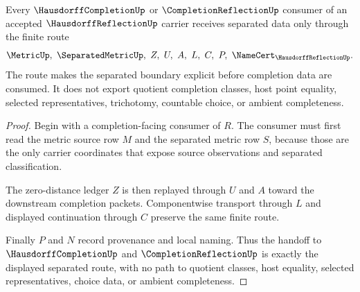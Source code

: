 \begin{theorem}
\label{thm:hausdorff-reflection-separated-handoff}
Every $\HausdorffCompletionUp$ or $\CompletionReflectionUp$ consumer of an accepted $\HausdorffReflectionUp$ carrier receives separated data only through the finite route
$$
\MetricUp,\ \SeparatedMetricUp,\ Z,\ U,\ A,\ L,\ C,\ P,\ \NameCert_{\HausdorffReflectionUp}.
$$
The route makes the separated boundary explicit before completion data are consumed. It does not export quotient completion classes, host point equality, selected representatives, trichotomy, countable choice, or ambient completeness.
\end{theorem}
\begin{proof}
Begin with a completion-facing consumer of $R$. The consumer must first read the metric source row $M$ and the separated metric row $S$, because those are the only carrier coordinates that expose source observations and separated classification.

The zero-distance ledger $Z$ is then replayed through $U$ and $A$ toward the downstream completion packets. Componentwise transport through $L$ and displayed continuation through $C$ preserve the same finite route.

Finally $P$ and $N$ record provenance and local naming. Thus the handoff to $\HausdorffCompletionUp$ and $\CompletionReflectionUp$ is exactly the displayed separated route, with no path to quotient classes, host equality, selected representatives, choice data, or ambient completeness.
\end{proof}


\begin{closurestatus}{\HausdorffReflectionUp}
  \theoryclosure{\seedClosure}
  \formalstatus{\unformalizedV}
\end{closurestatus}
